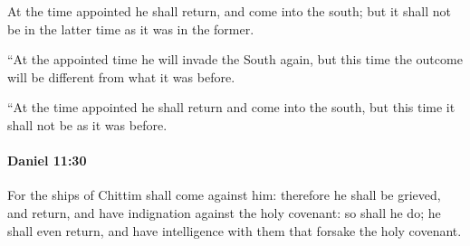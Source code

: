 			\begin{versebox}
					\item[BHS] 
					\item[LXX] 
					\item[ASV] At the time appointed he shall return, and come into the south; but it shall not be in the latter time as it was in the former.
					\item[NIV] “At the appointed time he will invade the South again, but this time the outcome will be different from what it was before.
					\item[NRSV] “At the time appointed he shall return and come into the south, but this time it shall not be as it was before.
			\end{versebox}

		\paragraph{Daniel 11:30} %
			\label{DANIEL-11-30}

			For the ships of Chittim shall come against him: therefore he shall be grieved, and return, and have indignation against the holy covenant: so shall he do; he shall even return, and have intelligence with them that forsake the holy covenant.


